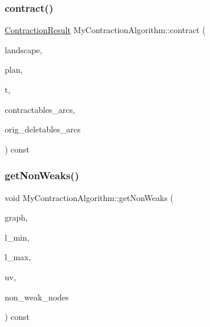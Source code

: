 \subsubsection{\texorpdfstring{contract()}{contract()}}
{\footnotesize\ttfamily \hyperlink{class_contraction_result}{Contraction\+Result} My\+Contraction\+Algorithm\+::contract (\begin{DoxyParamCaption}\item[{const \hyperlink{class_landscape}{Landscape} \&}]{landscape,  }\item[{const \hyperlink{class_restoration_plan}{Restoration\+Plan} \&}]{plan,  }\item[{Graph\+\_\+t\+::\+Node}]{t,  }\item[{const std\+::vector$<$ Graph\+\_\+t\+::\+Arc $>$ \&}]{contractables\+\_\+arcs,  }\item[{const std\+::vector$<$ Graph\+\_\+t\+::\+Arc $>$ \&}]{orig\+\_\+deletables\+\_\+arcs }\end{DoxyParamCaption}) const}

\mbox{\label{class_my_contraction_algorithm_a7163cb16dd44d41e7a1974ed9f367e8a}} 
\subsubsection{\texorpdfstring{get\+Non\+Weaks()}{getNonWeaks()}}
{\footnotesize\ttfamily void My\+Contraction\+Algorithm\+::get\+Non\+Weaks (\begin{DoxyParamCaption}\item[{const \hyperlink{pl__reff_8cpp_a65aea14f39d53b24df9910d54216d620}{Graph\+\_\+t} \&}]{graph,  }\item[{const Graph\+\_\+t\+::\+Arc\+Map$<$ double $>$ \&}]{l\+\_\+min,  }\item[{const Graph\+\_\+t\+::\+Arc\+Map$<$ double $>$ \&}]{l\+\_\+max,  }\item[{Graph\+\_\+t\+::\+Arc}]{uv,  }\item[{std\+::vector$<$ Graph\+\_\+t\+::\+Node $>$ \&}]{non\+\_\+weak\+\_\+nodes }\end{DoxyParamCaption}) const}

\mbox{\label{class_my_contraction_algorithm_a27a3be7ca9335a48ad08101c045bb883}} 

